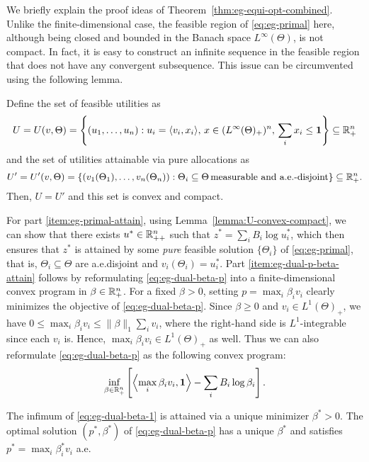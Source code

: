 We briefly explain the proof ideas of Theorem~\ref{thm:eg-equi-opt-combined}. 
Unlike the finite-dimensional case, the feasible region of \eqref{eq:eg-primal} here, although being closed and bounded in the Banach space $L^\infty(\Theta)$, is not compact. In fact, it is easy to construct an infinite sequence in the feasible region that does not have any convergent subsequence.
This issue can be circumvented using the following lemma.
\begin{lemma}
	Define the set of feasible utilities as
	\begin{align}
		U = U(v, \Theta) = \left\{ (u_1, \dots, u_n): u_i = \langle v_i, x_i\rangle,\, x\in (L^\infty(\Theta)_+)^n,\, \sum_i x_i \leq \mathbf{1} \right\} \subseteq \mathbb{R}_+^n \label{eq:def-U-U(v,Theta)}
	\end{align}
	and the set of utilities attainable via pure allocations as
	\[ U' = U'(v, \Theta) = \left\{ (v_1(\Theta_1), \dots, v_n(\Theta_n)): \Theta_i \subseteq \Theta\, \text{measurable and a.e.-disjoint} \right\} \subseteq \mathbb{R}_+^n. \]
	Then, $U = U'$ and this set is convex and compact.
	\label{lemma:U-convex-compact}
\end{lemma}
For part \ref{item:eg-primal-attain}, using Lemma~\ref{lemma:U-convex-compact}, we can show that there exists $u^* \in \mathbb{R}_{++}^n$ such that $z^* = \sum_i B_i \log u^*_i$, which then ensures that $z^*$ is attained by some \emph{pure} feasible solution $\{\Theta_i\}$ of \eqref{eq:eg-primal}, that is, $\Theta_i\subseteq \Theta$ are a.e.disjoint and $v_i(\Theta_i) = u^*_i$. Part \ref{item:eg-dual-p-beta-attain} follows by reformulating \eqref{eq:eg-dual-beta-p} into a finite-dimensional convex program in $\beta\in \mathbb{R}_+^n$. 
For a  fixed $\beta>0$, setting $p = \max_i \beta_i v_i$ clearly minimizes the objective of \eqref{eq:eg-dual-beta-p}. 
Since $\beta\geq 0$ and $v_i \in L^1(\Theta)_+$, we have
$ 0 \leq \max_i \beta_i v_i \leq \|\beta\|_1 \sum_i v_i$,
where the right-hand side is $L^1$-integrable since each $v_i$ is. Hence, $\max_i \beta_i v_i \in L^1(\Theta)_+$ as well. 
Thus we can also reformulate \eqref{eq:eg-dual-beta-p} as the following convex program:
\begin{align}
\inf_{\beta\in \mathbb{R}_+^n} \left[\left \langle \max_i \beta_i v_i, \mathbf{1} \right \rangle - \sum_i B_i \log \beta_i\right].  \label{eq:eg-dual-beta-1}
\end{align} 
\begin{lemma}
	The infimum of \eqref{eq:eg-dual-beta-1} is attained via a unique minimizer $\beta^* > 0$. The optimal solution $(p^*, \beta^*)$ of \eqref{eq:eg-dual-beta-p} has a unique $\beta^*$ and satisfies $p^* = \max_i \beta^*_i v_i$ a.e.
	\label{lemma:beta-dual-attain}
\end{lemma}
